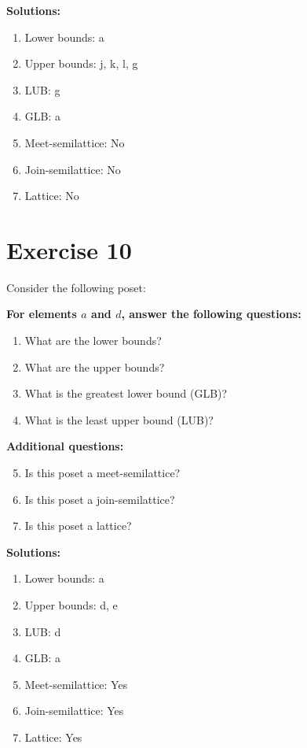 \documentclass{article}
\begin{document}
\textbf{Solutions:}
\begin{enumerate}
    \item Lower bounds: {a}
    \item Upper bounds: {j, k, l, g}
    \item LUB: g
    \item GLB: a
    \item Meet-semilattice: No
    \item Join-semilattice: No
    \item Lattice: No
\end{enumerate}
\newpage
\section*{Exercise 10}
Consider the following poset:
\begin{center}
\end{center}

    \textbf{For elements $a$ and $d$, answer the following questions:}
\begin{enumerate}
    \item What are the lower bounds?
    \item What are the upper bounds?
    \item What is the greatest lower bound (GLB)?
    \item What is the least upper bound (LUB)?
\end{enumerate}
    \hspace*{3ex} \textbf{Additional questions:}
\begin{enumerate}
    \setcounter{enumi}{4}
    \item Is this poset a meet-semilattice?
    \item Is this poset a join-semilattice?
    \item Is this poset a lattice?
\end{enumerate}

\textbf{Solutions:}
\begin{enumerate}
    \item Lower bounds: {a}
    \item Upper bounds: {d, e}
    \item LUB: d
    \item GLB: a
    \item Meet-semilattice: Yes
    \item Join-semilattice: Yes
    \item Lattice: Yes
\end{enumerate}
\newpage
\end{document}
